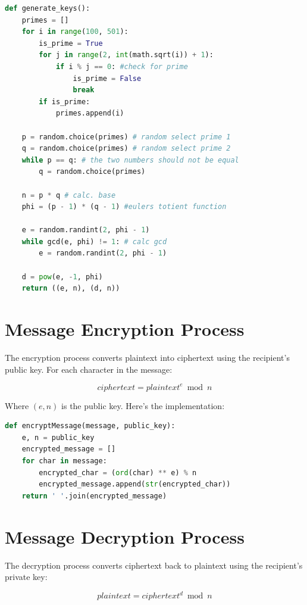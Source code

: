 \documentclass[12pt,a4paper]{report}
\begin{document}
\begin{lstlisting}[language=Python, caption=Key Generation Algorithm]
def generate_keys():
    primes = []
    for i in range(100, 501):
        is_prime = True
        for j in range(2, int(math.sqrt(i)) + 1):
            if i % j == 0: #check for prime
                is_prime = False
                break
        if is_prime:
            primes.append(i)

    p = random.choice(primes) # random select prime 1
    q = random.choice(primes) # random select prime 2
    while p == q: # the two numbers should not be equal
        q = random.choice(primes)

    n = p * q # calc. base
    phi = (p - 1) * (q - 1) #eulers totient function

    e = random.randint(2, phi - 1)
    while gcd(e, phi) != 1: # calc gcd
        e = random.randint(2, phi - 1)

    d = pow(e, -1, phi)
    return ((e, n), (d, n))
\end{lstlisting}

\section{Message Encryption Process}
The encryption process converts plaintext into ciphertext using the recipient's public key. For each character in the message:

\begin{equation}
ciphertext = plaintext^e \bmod n
\end{equation}

Where $(e,n)$ is the public key. Here's the implementation:

\begin{lstlisting}[language=Python, caption=Message Encryption Function]
def encryptMessage(message, public_key):
    e, n = public_key
    encrypted_message = []
    for char in message:
        encrypted_char = (ord(char) ** e) % n
        encrypted_message.append(str(encrypted_char))
    return ' '.join(encrypted_message)
\end{lstlisting}

\section{Message Decryption Process}
The decryption process converts ciphertext back to plaintext using the recipient's private key:

\begin{equation}
plaintext = ciphertext^d \bmod n
\end{equation}
\end{document}
